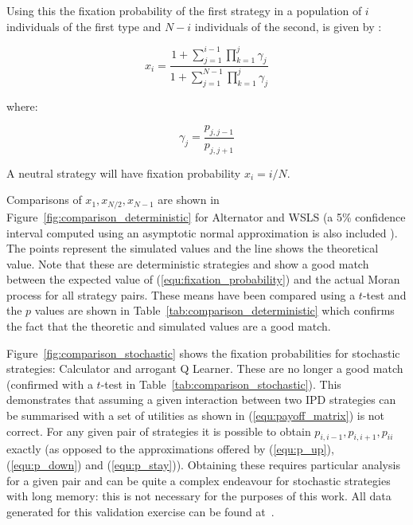 \documentclass[10pt,journal]{IEEEtran}
\begin{document}
Using this the fixation probability
of the first strategy in a population of \(i\) individuals of the first type
and \(N-i\) individuals of the second, is given by \cite{Nowak2017}:

\begin{equation}\label{equ:fixation_probability}
x_i = \frac{1 + \sum_{j=1}^{i-1}\prod_{k=1}^{j}\gamma_j}{1 + \sum_{j=1}^{N-1}
      \prod_{k=1}^{j}\gamma_j}
\end{equation}

where:

\[
\gamma_j = \frac{p_{j, j-1}}{p_{j, j+1}}
\]

A neutral strategy will have fixation probability $x_i = i/N$.

Comparisons of \(x_1, x_{N/2}, x_{N-1}\) are shown in
Figure~\ref{fig:comparison_deterministic} for Alternator and WSLS (a 5\%
confidence interval computed using an asymptotic normal approximation is also
included \cite{brown2001interval}).
The points represent the simulated
values and the line shows the theoretical value. Note that these are 
deterministic strategies and show a good match between the expected value
of (\ref{equ:fixation_probability}) and the actual Moran process for all
strategy pairs. These means have been compared using a \(t\)-test and the \(p\)
values are shown in Table~\ref{tab:comparison_deterministic} which confirms the
fact that the theoretic and simulated values are a good match.

Figure~\ref{fig:comparison_stochastic} shows the fixation probabilities for
stochastic strategies: Calculator and arrogant Q Learner. These are no longer a
good match (confirmed with a \(t\)-test in
Table~\ref{tab:comparison_stochastic}). This demonstrates that assuming
a given interaction between two IPD strategies can be summarised with a set of
utilities as shown in (\ref{equ:payoff_matrix}) is not correct. For any given pair of
strategies it is possible to obtain \(p_{i,i-1}, p_{i,i+1}, p_{ii}\) exactly (as
opposed to the approximations offered by (\ref{equ:p_up}), (\ref{equ:p_down})
and (\ref{equ:p_stay})). Obtaining these requires particular analysis for a
given pair and can be quite a complex endeavour for stochastic strategies with
long memory: this is not necessary for the purposes of this work.  All data
generated for this validation exercise can be found at~\cite{data}.
\end{document}
